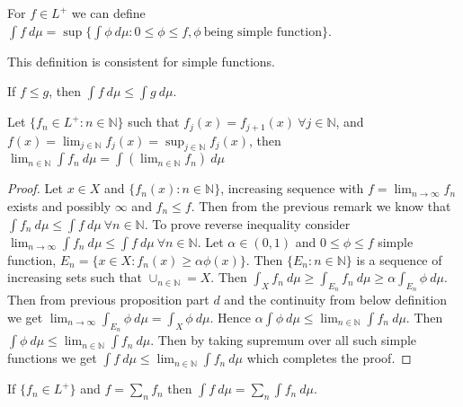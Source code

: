 \documentclass[a4paper,english,12pt]{article}   	%
\begin{document}
\begin{defn}
For $f \in L^{+}$ we can define $\int f ~d\mu = \sup \{\int \phi ~d\mu \colon 0 \leq \phi \leq f, \phi ~\text {being simple function}\}$.
\end{defn}
\begin{rem}
This definition is consistent for simple functions.
\end{rem}
\begin{rem}
If $f \leq g$, then $\int f ~d\mu \leq \int g ~d\mu$.
\end{rem}
\begin{thm}
Let $\{f_{n} \in L^{+} \colon n \in \mathbb{N}\}$ such that $f_{j}(x) = f_{j+1}(x) ~\forall j \in \mathbb{N}$, and $f(x) = \lim_{j \in \mathbb{N}} f_{j}(x) = \sup_{j \in \mathbb{N}} f_{j}(x)$, then $ \lim_{n \in \mathbb{N}} \int f_{n} ~d\mu = \int ( \lim_{n \in \mathbb{N}} f_{n}) ~d\mu$
\end{thm}
\begin{proof}
Let $x \in X$ and $\{f_{n}(x) \colon n \in \mathbb{N} \}$, increasing sequence with $f = \lim_{n \to \infty} f_{n}$ exists and possibly $\infty$ and $f_{n} \leq f$. Then from the previous remark we know that $\int f_{n} ~d\mu \leq \int f ~d\mu ~\forall n \in \mathbb{N}$. To prove reverse inequality consider  $\lim_{n \to \infty} \int f_{n} ~d\mu \leq \int f ~d\mu ~\forall n \in \mathbb{N}$. Let $\alpha \in (0,1)$ and $0 \leq \phi \leq f$ simple function, $E_{n} = \{x \in X \colon f_{n}(x) \geq \alpha \phi(x)\}$. Then $\{E_{n} \colon n \in \mathbb{N} \}$ is a sequence of increasing sets such that $\cup_{n \in \mathbb{N}} = X$. Then $\int_{X} f_{n} ~d\mu \geq \int_{E_{n}}f_{n} ~d\mu \geq \alpha \int_{E_{n}} \phi ~d\mu$. Then from previous proposition part $d$ and the continuity from below definition we get $\lim_{n \to \infty} \int_{E_{n}} \phi ~d\mu = \int_{X} \phi ~d\mu$. Hence $\alpha \int \phi ~d\mu \leq \lim_{n \in \mathbb{N}} \int f_{n} ~d\mu$. Then $\int \phi ~d\mu \leq \lim_{n \in \mathbb{N}} \int f_{n} ~d\mu$. Then by taking supremum over all such simple functions we get $\int f ~d\mu \leq \lim_{n \in \mathbb{N}} \int f_{n} ~d\mu$ which completes the proof.
\end{proof}
\begin{thm}
If $\{f_{n} \in L^{+}\}$ and $f = \sum_{n} f_{n}$ then $\int f ~d\mu = \sum_{n} \int f_{n} ~d\mu$.
\end{thm}
\end{document}
